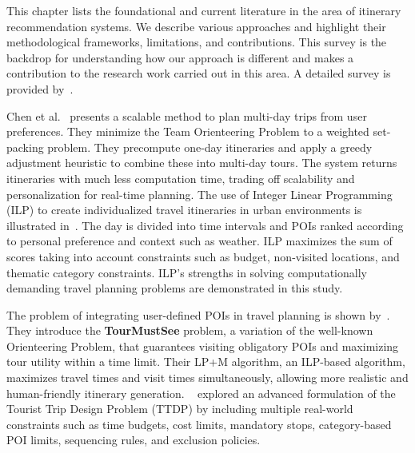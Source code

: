 This chapter lists the foundational and current literature in the area of itinerary recommendation systems. We describe various approaches and highlight their methodological frameworks, limitations, and contributions. This survey is the backdrop for understanding how our approach is different and makes a contribution to the research work carried out in this area. A detailed survey is provided by~\cite{gavalas2014survey, sylejmani2011survey}.

Chen et al.~\cite{chen2014automatic} presents a scalable method to plan multi-day trips from user preferences. They minimize the Team Orienteering Problem to a weighted set-packing problem. They precompute one-day itineraries and apply a greedy adjustment heuristic to combine these into multi-day tours. The system returns itineraries with much less computation time, trading off scalability and personalization for real-time planning. The use of Integer Linear Programming (ILP) to create individualized travel itineraries in urban environments is illustrated in~\cite{vanzelst2016itinerary}. The day is divided into time intervals and POIs ranked according to personal preference and context such as weather. ILP maximizes the sum of scores taking into account constraints such as budget, non-visited locations, and thematic category constraints. ILP's strengths in solving computationally demanding travel planning problems are demonstrated in this study.

The problem of integrating user-defined POIs in travel planning is shown by~\cite{taylor2018tour}. They introduce the \textbf{TourMustSee} problem, a variation of the well-known Orienteering Problem, that guarantees visiting obligatory POIs and maximizing tour utility within a time limit. Their LP+M algorithm, an ILP-based algorithm, maximizes travel times and visit times simultaneously, allowing more realistic and human-friendly itinerary generation. ~\cite{vu2022branch} explored an advanced formulation of the Tourist Trip Design Problem (TTDP) by including multiple real-world constraints such as time budgets, cost limits, mandatory stops, category-based POI limits, sequencing rules, and exclusion policies.

